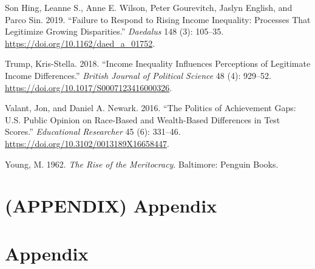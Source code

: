 \documentclass[
  10pt]{article}
\newlength{\cslhangindent}
\newenvironment{CSLReferences}[2] %
 {\begin{list}{}{%
  \setlength{\itemindent}{0pt}
  \setlength{\leftmargin}{0pt}
  \setlength{\parsep}{0pt}
  \ifodd #1
   \setlength{\leftmargin}{\cslhangindent}
   \setlength{\itemindent}{-1\cslhangindent}
  \fi
  \setlength{\itemsep}{#2\baselineskip}}}
 {\end{list}}
\begin{document}
\begin{CSLReferences}{1}{0}
Son Hing, Leanne S., Anne E. Wilson, Peter Gourevitch, Jaslyn English,
and Parco Sin. 2019. {``Failure to {Respond} to {Rising Income
Inequality}: {Processes That Legitimize Growing Disparities}.''}
\emph{Daedalus} 148 (3): 105--35.
\url{https://doi.org/10.1162/daed_a_01752}.

Trump, Kris-Stella. 2018. {``Income {Inequality Influences Perceptions}
of {Legitimate Income Differences}.''} \emph{British Journal of
Political Science} 48 (4): 929--52.
\url{https://doi.org/10.1017/S0007123416000326}.

Valant, Jon, and Daniel A. Newark. 2016. {``The {Politics} of
{Achievement Gaps}: {U}.{S}. {Public Opinion} on {Race-Based} and
{Wealth-Based Differences} in {Test Scores}.''} \emph{Educational
Researcher} 45 (6): 331--46.
\url{https://doi.org/10.3102/0013189X16658447}.

Young, M. 1962. \emph{The Rise of the Meritocracy}. Baltimore: Penguin
Books.

\end{CSLReferences}

\section*{(APPENDIX) Appendix}\label{appendix-appendix}

\appendix \section{Appendix}
\end{document}
